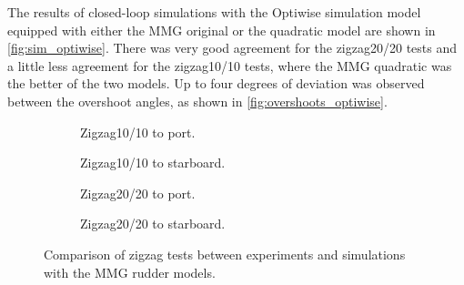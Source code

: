 The results of closed-loop simulations with the Optiwise simulation model equipped with either the MMG original or the quadratic model are shown in \autoref{fig:sim_optiwise}. There was very good agreement for the zigzag20/20 tests and a little less agreement for the zigzag10/10 tests, where the MMG quadratic was the better of the two models. Up to four degrees of deviation was observed between the overshoot angles, as shown in \autoref{fig:overshoots_optiwise}.   
\begin{figure}[h]
     \centering
     \begin{subfigure}[b]{0.40\textwidth}
         \centering
         
        \caption{Zigzag10/10 to port.}
        \label{fig:sim_optiwise_10_port}
     \end{subfigure}
     \hfill
     \begin{subfigure}[b]{0.40\textwidth}
         
        \caption{Zigzag10/10 to starboard.}
        \label{fig:sim_optiwise_10_stbd}
     \end{subfigure}
     \vfill
     \begin{subfigure}[b]{0.40\textwidth}
         \centering
         
        \caption{Zigzag20/20 to port.}
        \label{fig:sim_optiwise_20_port}
     \end{subfigure}
     \hfill
     \begin{subfigure}[b]{0.40\textwidth}
         
        \caption{Zigzag20/20 to starboard.}
        \label{fig:sim_optiwise_20_stbd}
     \end{subfigure}
     
        \caption{Comparison of zigzag tests between experiments and simulations with the MMG rudder models.}
        \label{fig:sim_optiwise}
\end{figure}
\vspace{-1cm}

